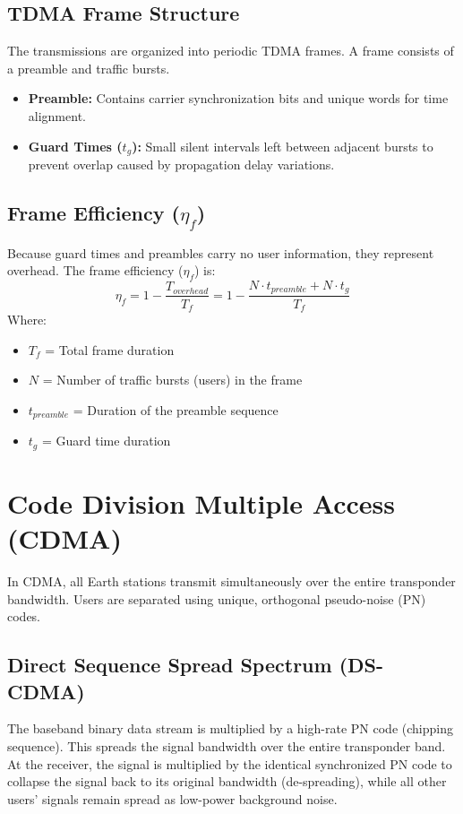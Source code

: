 \documentclass[12pt,a4paper]{article}
\begin{document}
\subsection{TDMA Frame Structure}
The transmissions are organized into periodic TDMA frames. A frame consists of a preamble and traffic bursts.

\begin{itemize}[leftmargin=*, itemsep=3.5pt]
  \item \textbf{Preamble:} Contains carrier synchronization bits and unique words for time alignment.
  \item \textbf{Guard Times ($t_g$):} Small silent intervals left between adjacent bursts to prevent overlap caused by propagation delay variations.
\end{itemize}

\subsection{Frame Efficiency (\texorpdfstring{$\eta_f$}{eta\_f})}
Because guard times and preambles carry no user information, they represent overhead. The frame efficiency ($\eta_f$) is:
\begin{equation}
  \eta_f = 1 - \frac{T_{overhead}}{T_f} = 1 - \frac{N \cdot t_{preamble} + N \cdot t_g}{T_f}
\end{equation}
Where:
\begin{itemize}[leftmargin=*, itemsep=3pt]
  \item $T_f$ = Total frame duration
  \item $N$ = Number of traffic bursts (users) in the frame
  \item $t_{preamble}$ = Duration of the preamble sequence
  \item $t_g$ = Guard time duration
\end{itemize}

\section{Code Division Multiple Access (CDMA)}

In CDMA, all Earth stations transmit simultaneously over the entire transponder bandwidth. Users are separated using unique, orthogonal pseudo-noise (PN) codes.

\subsection{Direct Sequence Spread Spectrum (DS-CDMA)}
The baseband binary data stream is multiplied by a high-rate PN code (chipping sequence). This spreads the signal bandwidth over the entire transponder band. At the receiver, the signal is multiplied by the identical synchronized PN code to collapse the signal back to its original bandwidth (de-spreading), while all other users' signals remain spread as low-power background noise.
\end{document}
